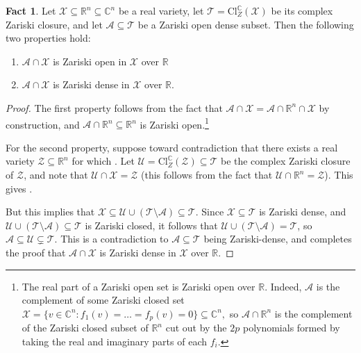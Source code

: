 \documentclass[11pt]{article}
\theoremstyle{definition}
\newtheorem{fact}[theorem]{Fact}
\newcommand{\setft}[1]{\mathrm{#1}}
\newcommand{\complex}{\mathbb{C}}
\newcommand{\real}{\mathbb{R}}
\newcommand\X{\mathcal{X}}
\newcommand\Y{\mathcal{Y}}
\newcommand\Z{\mathcal{Z}}
\newcommand\A{\mathcal{A}}
\newcommand\U{\mathcal{U}}
\newcommand\T{\mathcal{T}}
\def\ba#1\ea{\begin{align}#1\end{align}}
\begin{document}
\begin{fact}\label{fact:real_vs_complex}
Let $\X \subseteq \real^n\subseteq \complex^n$ be a real variety, let $\T=\setft{Cl}_Z^{\complex}(\X)$ be its complex Zariski closure, and let $\A \subseteq \T$ be a Zariski open dense subset. Then the following two properties hold:
\begin{enumerate}
\item $\A \cap \X$ is Zariski open in $\X$ over $\real$
\item $\A \cap \X$ is Zariski dense in $\X$ over $\real$.
\end{enumerate}
\end{fact}
\begin{proof}
The first property follows from the fact that $\A \cap \X=\A \cap \real^n \cap \X$ by construction, and $\A \cap \real^n\subseteq \real^n$ is Zariski open.\footnote{The real part of a Zariski open set is Zariski open over $\real$. Indeed, $\A$ is the complement of some Zariski closed set $\X=\{v \in \complex^n :f_1(v)=\dots=f_{p}(v)=0\}\subseteq \complex^n,$ so $\A\cap \real^n$ is the complement of the Zariski closed subset of $\real^n$ cut out by the $2 p$ polynomials formed by taking the real and imaginary parts of each $f_i$.}

For the second property, suppose toward contradiction that there exists a real variety $\Z\subseteq \real^n$ for which
\ba
\A \cap \X \subseteq \Z \subsetneq \X.
\ea
Let $\U=\setft{Cl}_Z^{\complex}(\Z) \subseteq \T$ be the complex Zariski closure of $\Z$, and note that $\U \cap \X=\Z$ (this follows from the fact that $\U \cap \real^n = \Z$). This gives
\ba
\A \cap \X \subseteq \U \cap \X \subsetneq \X.
\ea

But this implies that $\X \subseteq \U \cup (\T\setminus \A) \subseteq \T$. Since $\X\subseteq \T$ is Zariski dense, and $ \U \cup (\T\setminus \A) \subseteq \T$ is Zariski closed, it follows that $ \U \cup (\T\setminus \A) = \T$, so $\A \subseteq \U \subsetneq \T$. This is a contradiction to $\A \subseteq \T$ being Zariski-dense, and completes the proof that $\A \cap \X$ is Zariski dense in $\X$ over $\real$.
\end{proof}

\end{document}

